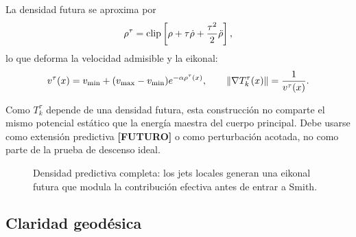 La densidad futura se aproxima por
\begin{equation}
  \rho^\tau=
  \operatorname{clip}\left[
  \rho+\tau\dot\rho+\frac{\tau^2}{2}\ddot\rho
  \right],
  \label{eq:anexo_rho_tau}
\end{equation}
lo que deforma la velocidad admisible y la eikonal:
\begin{equation}
  v^\tau(x)=v_{\min}+(v_{\max}-v_{\min})e^{-\alpha\rho^\tau(x)},
  \qquad
  \left\|\nabla T_k^\tau(x)\right\|=\frac{1}{v^\tau(x)}.
  \label{eq:anexo_eikonal_predictiva}
\end{equation}

Como $T_k^\tau$ depende de una densidad futura, esta construcción no comparte el mismo
potencial estático que la energía maestra del cuerpo principal. Debe usarse como
extensión predictiva \textbf{[FUTURO]} o como perturbación acotada, no como parte de la
prueba de descenso ideal.

\begin{figure}[H]
\centering
{}
\caption{Densidad predictiva completa: los jets locales generan una eikonal futura que
modula la contribución efectiva antes de entrar a Smith.}
\label{fig:anexo_densidad}
\end{figure}

\subsection{Claridad geodésica}
\label{subsec:claridad-geodesica}

